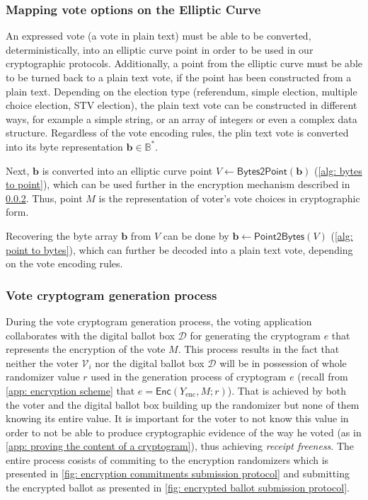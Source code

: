 \subsubsection{Mapping vote options on the Elliptic Curve} \label{sec: mapping vote options on the elliptic curve}
An expressed vote (a vote in plain text) must be able to be converted, deterministically, into an elliptic curve point in order to be used in our cryptographic protocols. Additionally, a point from the elliptic curve must be able to be turned back to a plain text vote, if the point has been constructed from a plain text. Depending on the election type (referendum, simple election, multiple choice election, STV election), the plain text vote can be constructed in different ways, for example a simple string, or an array of integers or even a complex data structure. Regardless of the vote encoding rules, the plin text vote is converted into its byte representation $\boldsymbol{b} \in \mathbb{B}^*$.

Next, $\boldsymbol{b}$ is converted into an elliptic curve point $V \gets \mathsf{Bytes2Point}(\boldsymbol{b})$ (\cref{alg: bytes to point}), which can be used further in the encryption mechanism described in \cref{sec: vote cryptogram generation process}. Thus, point $M$ is the representation of voter's vote choices in cryptographic form.

Recovering the byte array $\boldsymbol{b}$ from $V$ can be done by $\boldsymbol{b} \gets \mathsf{Point2Bytes}(V)$ (\cref{alg: point to bytes}), which can further be decoded into a plain text vote, depending on the vote encoding rules.


\subsubsection{Vote cryptogram generation process} \label{sec: vote cryptogram generation process}
During the vote cryptogram generation process, the voting application collaborates with the digital ballot box $\mathcal{D}$ for generating the cryptogram $e$ that represents the encryption of the vote $M$. This process results in the fact that neither the voter $\mathcal{V}_i$ nor the digital ballot box $\mathcal{D}$ will be in possession of whole randomizer value $r$ used in the generation process of cryptogram $e$ (recall from \cref{app: encryption scheme} that $e = \mathsf{Enc}(Y_\mathrm{enc}, M; r)$). That is achieved by both the voter and the digital ballot box building up the randomizer but none of them knowing its entire value. It is important for the voter to not know this value in order to not be able to produce cryptographic evidence of the way he voted (as in \cref{app: proving the content of a cryptogram}), thus achieving \textit{receipt freeness}. The entire process cosists of commiting to the encryption randomizers which is presented in \cref{fig: encryption commitments submission protocol} and submitting the encrypted ballot as presented in \cref{fig: encrypted ballot submission protocol}.

